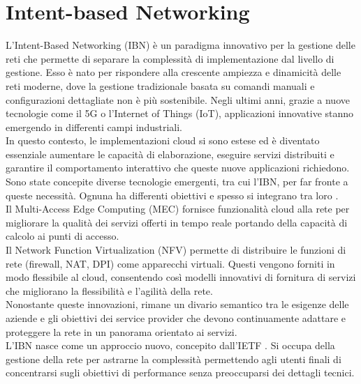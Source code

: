 \section{Intent-based Networking}
\label{ch:IBN}
L'Intent-Based Networking (IBN) è un paradigma innovativo per la gestione delle reti che permette di separare la complessità di implementazione dal livello di gestione.
Esso è nato per rispondere alla crescente ampiezza e dinamicità delle reti moderne, dove la gestione tradizionale basata su comandi manuali e configurazioni dettagliate non è più sostenibile.
Negli ultimi anni, grazie a nuove tecnologie come il 5G o l'Internet of Things (IoT), applicazioni innovative stanno emergendo in differenti campi industriali.
\\In questo contesto, le implementazioni cloud si sono estese ed è diventato essenziale aumentare le capacità di elaborazione, eseguire servizi distribuiti e garantire il 
comportamento interattivo che queste nuove applicazioni richiedono.
\\Sono state concepite diverse tecnologie emergenti, tra cui l'IBN, per far fronte a queste necessità. Ognuna ha differenti obiettivi e spesso si integrano tra loro \cite{ibn}.
\\Il Multi-Access Edge Computing\cite{mec} (MEC) fornisce funzionalità cloud alla rete per migliorare la qualità dei servizi offerti in tempo reale portando della capacità di calcolo ai punti di accesso.
\\Il Network Function Virtualization\cite{nfv} (NFV) permette di distribuire le funzioni di rete (firewall, NAT, DPI) come apparecchi virtuali. Questi vengono forniti in modo flessibile al cloud, consentendo 
così modelli innovativi di fornitura di servizi che migliorano la flessibilità e l'agilità della rete.
\\Nonostante queste innovazioni, rimane un divario semantico tra le esigenze delle aziende e gli obiettivi dei service provider che devono continuamente adattare e proteggere la rete in un panorama orientato ai servizi.
\\L'IBN nasce come un approccio nuovo, concepito dall'IETF \cite{ietf}. Si occupa della gestione della rete per astrarne la complessità permettendo agli utenti finali di concentrarsi sugli obiettivi di performance senza preoccuparsi dei dettagli tecnici.
